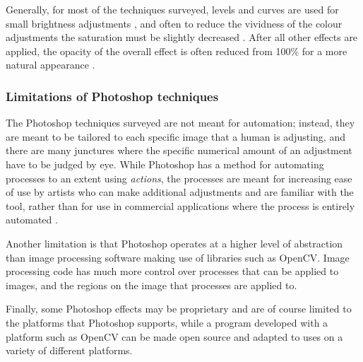 \begin{table}[H]
\begin{tabular}{|c|c|c|}
\begin{minipage}{.29\textwidth}
  \end{minipage} \\
    \hline
\end{tabular}
\end{table}

Generally, for most of the techniques surveyed, levels and curves are used for small brightness adjustments \cite{photoshop:obama, photoshop:match_body, photoshop:match_other}, and often to reduce the vividness of the colour adjustments the saturation must be slightly decreased \cite{photoshop:obama, photoshop:match_body}. After all other effects are applied, the opacity of the overall effect is often reduced from 100\% for a more natural appearance \cite{photoshop:obama, photoshop:match_body}.

\subsubsection*{Limitations of Photoshop techniques}
The Photoshop techniques surveyed are not meant for automation; instead, they are meant to be tailored to each specific image that a human is adjusting, and there are many junctures where the specific numerical amount of an adjustment have to be judged by eye. While Photoshop has a method for automating processes to an extent using \textit{actions}, the processes are meant for increasing ease of use by artists who can make additional adjustments and are familiar with the tool, rather than for use in commercial applications where the process is entirely automated \cite{photoshop:actions}.

Another limitation is that Photoshop operates at a higher level of abstraction than image processing software making use of libraries such as OpenCV. Image processing code has much more control over processes that can be applied to images, and the regions on the image that processes are applied to. 

Finally, some Photoshop effects may be proprietary and are of course limited to the platforms that Photoshop supports, while a program developed with a platform such as OpenCV can be made open source and adapted to uses on a variety of different platforms.